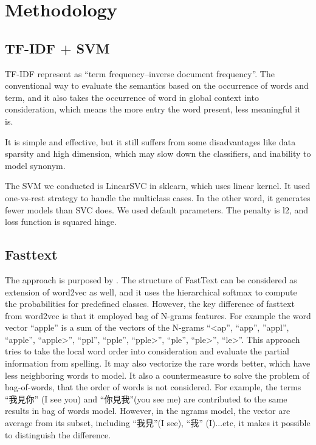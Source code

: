 \chapter{Methodology}

\section{TF-IDF + SVM}

	TF-IDF represent as \enquote{term frequency–inverse document frequency}. The conventional way to evaluate the semantics based on the occurrence of words and term, 
  and it also takes the occurrence of word in global context into consideration, which means the more entry the word present, less meaningful it is.

  It is simple and effective, but it still suffers from some disadvantages like data sparsity and high dimension, which may slow down the classifiers, and inability to model synonym. 

  The SVM we conducted is LinearSVC in sklearn, which uses linear kernel. It used one-vs-rest strategy to handle the multiclass cases.
  In the other word, it generates fewer models than SVC does.
  We used default parameters. The penalty is l2, and loss function is squared hinge. 

\section{Fasttext}
	
The approach is purposed by \cite{joulin2016fasttext}. 
The structure of FastText can be considered as extension of word2vec as well, and it uses the hierarchical softmax to compute the probabilities for predefined classes. 
However, the key difference of fasttext from word2vec is that it employed bag of N-grams features. 
For example the word vector “apple” is a sum of the vectors of the N-grams “\textless ap”, “app”, ”appl”, “apple”, “apple\textgreater”, “ppl”, “pple”, “pple\textgreater”, “ple”, “ple\textgreater”, “le\textgreater”.
This approach tries to take the local word order into consideration and evaluate the partial information from spelling. It may also vectorize the rare words better, which have less neighboring words to model.
It also a countermeasure to solve the problem of bag-of-words, that the order of words is not considered. 
For example, the terms \enquote{我見你} (I see you) and \enquote{你見我}(you see me) are contributed to the same results in bag of words model.
However, in the ngrams model, the vector are average from its subset, including \enquote{我見}(I see), \enquote{我} (I)...etc, it makes it possible to distinguish the difference.

